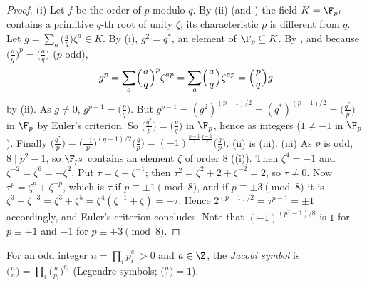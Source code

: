\begin{proof}
(i) Let $f$ be the order of $p$ modulo $q$. By (ii) (and ) the field $K=\F_{p^f}$ contains a
primitive $q$-th root of unity $\zeta$; its characteristic $p$ is different from $q$. Let $g=\sum_a\bigl(\frac aq\bigr)\zeta^a\in K$. By
(i), $g^2=q^*$, an element of $\F_p\subseteq K$. By , and because
$\bigl(\frac aq\bigr)^p=\bigl(\frac aq\bigr)$ ($p$ odd),
\[
g^p=\sum_a\Bigl(\frac aq\Bigr)^p\zeta^{ap}=\sum_a\Bigl(\frac aq\Bigr)\zeta^{ap}=\Bigl(\frac pq\Bigr)g
\]
by (ii). As $g\ne0$, $g^{p-1}=\bigl(\frac pq\bigr)$. But $g^{p-1}=(g^2)^{(p-1)/2}=(q^*)^{(p-1)/2}=\bigl(\frac{q^*}p\bigr)$ in $\F_p$ by Euler's criterion. So
$\bigl(\frac{q^*}p\bigr)=\bigl(\frac pq\bigr)$ in $\F_p$, hence as integers ($1\ne-1$ in $\F_p$). Finally
$\bigl(\frac{q^*}p\bigr)=\bigl(\frac{-1}p\bigr)^{(q-1)/2}\bigl(\frac qp\bigr)=(-1)^{\frac{p-1}2\frac{q-1}2}\bigl(\frac qp\bigr)$.
(ii) is (iii).
(iii) As $p$ is odd, $8\mid p^2-1$, so $\F_{p^2}$ contains an element $\zeta$ of order $8$ ((i)). Then $\zeta^4=-1$ and $\zeta^{-2}=\zeta^6=-\zeta^2$.
Put $\tau=\zeta+\zeta^{-1}$; then $\tau^2=\zeta^2+2+\zeta^{-2}=2$, so $\tau\ne0$. Now $\tau^p=\zeta^p+\zeta^{-p}$, which is $\tau$ if $p\equiv\pm1\pmod8$, and if $p\equiv\pm3\pmod8$
it is $\zeta^3+\zeta^{-3}=\zeta^3+\zeta^5=\zeta^4(\zeta^{-1}+\zeta)=-\tau$. Hence $2^{(p-1)/2}=\tau^{p-1}=\pm1$ accordingly, and Euler's criterion concludes. Note that
$(-1)^{(p^2-1)/8}$ is $1$ for $p\equiv\pm1$ and $-1$ for $p\equiv\pm3\pmod8$.
\end{proof}

\begin{definition}\label{def:rings:jacobi}
For an odd integer $n=\prod_ip_i^{e_i}>0$ and $a\in\Z$, the \emph{Jacobi symbol} is $\bigl(\frac an\bigr)=\prod_i\bigl(\frac a{p_i}\bigr)^{e_i}$ (Legendre symbols; $\bigl(\frac a1\bigr)=1$).
\end{definition}


